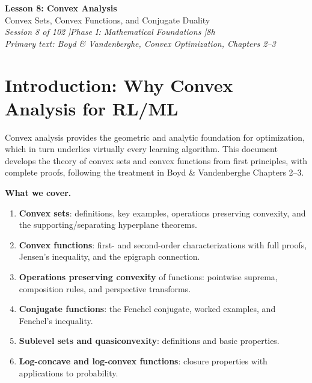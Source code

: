 \documentclass[11pt,a4paper]{article}
\theoremstyle{definition}
\theoremstyle{remark}
\begin{document}

\begin{center}
  {\LARGE \textbf{Lesson 8: Convex Analysis}} \\[8pt]
  {\large Convex Sets, Convex Functions, and Conjugate Duality} \\[12pt]
  \textit{Session 8 of 102 \quad|\quad Phase I: Mathematical Foundations \quad|\quad 8h} \\[4pt]
  \textit{Primary text: Boyd \& Vandenberghe, Convex Optimization, Chapters 2--3}
\end{center}

\vspace{0.5cm}

\tableofcontents
\newpage

\section{Introduction: Why Convex Analysis for RL/ML}

Convex analysis provides the geometric and analytic foundation for optimization, which
in turn underlies virtually every learning algorithm. This document develops the theory
of convex sets and convex functions from first principles, with complete proofs,
following the treatment in Boyd \& Vandenberghe Chapters 2--3.

\textbf{What we cover.}
\begin{enumerate}[label=(\roman*)]
  \item \textbf{Convex sets}: definitions, key examples, operations preserving convexity,
        and the supporting/separating hyperplane theorems.
  \item \textbf{Convex functions}: first- and second-order characterizations with full
        proofs, Jensen's inequality, and the epigraph connection.
  \item \textbf{Operations preserving convexity} of functions: pointwise suprema,
        composition rules, and perspective transforms.
  \item \textbf{Conjugate functions}: the Fenchel conjugate, worked examples, and
        Fenchel's inequality.
  \item \textbf{Sublevel sets and quasiconvexity}: definitions and basic properties.
  \item \textbf{Log-concave and log-convex functions}: closure properties with
        applications to probability.
\end{enumerate}
\end{document}

